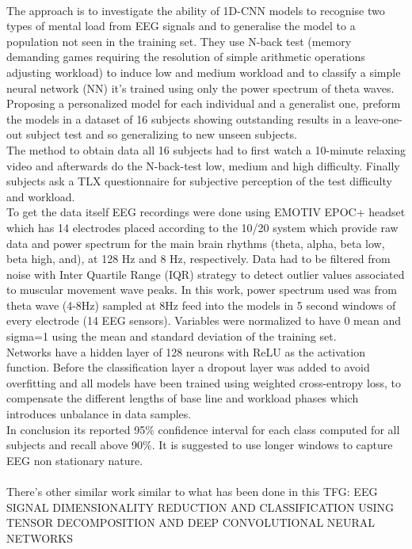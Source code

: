 \leavevmode\\
The approach is to investigate the ability of 1D-CNN models to recognise two types of mental load from EEG signals and to generalise the model to a population not seen in the training set. They use N-back test (memory demanding games requiring the resolution of simple arithmetic operations adjusting workload) to induce low and medium workload and to classify a simple neural network (NN) it’s trained using only the power spectrum of theta waves. Proposing a personalized model for each individual and a generalist one, preform the models in a dataset of 16 subjects showing outstanding results in a leave-one-out subject test and so generalizing to new unseen subjects.
\\
The method to obtain data all 16 subjects had to first watch a 10-minute relaxing video and afterwards do the N-back-test low, medium and high difficulty. Finally subjects ask a TLX questionnaire for subjective perception of the test difficulty and workload.
\\
To get the data itself EEG recordings were done using EMOTIV EPOC+ headset which has 14 electrodes placed according to the 10/20 system which provide raw data and power spectrum for the main brain rhythms (theta, alpha, beta low, beta high, and), at 128 Hz and 8 Hz, respectively. Data had to be filtered from noise with Inter Quartile Range (IQR) strategy to detect outlier values associated to muscular movement wave peaks. In this work, power spectrum used was from theta wave (4-8Hz) sampled at 8Hz feed into the models in 5 second windows of every electrode (14 EEG sensors). Variables were normalized to have 0 mean and
sigma=1 using the mean and standard deviation of the training set. 
\\
Networks have a hidden layer of 128 neurons with ReLU as the activation function. Before the classification layer a dropout layer was added to avoid overfitting and all models have been trained using weighted cross-entropy loss, to compensate the different lengths of base line and workload phases which introduces unbalance in data samples.
\\
In conclusion its reported 95\% confidence interval for each class computed for all subjects and recall above 90\%. It is suggested to use longer windows to capture EEG non stationary nature.
\\
\leavevmode\\
There's other similar work similar to what has been done in this TFG: EEG SIGNAL DIMENSIONALITY REDUCTION AND CLASSIFICATION USING TENSOR DECOMPOSITION AND DEEP CONVOLUTIONAL NEURAL NETWORKS\cite{relatedwork}
